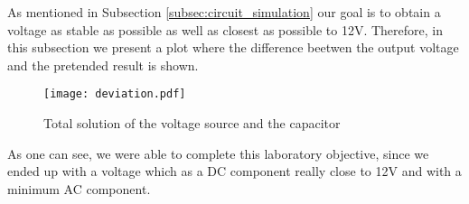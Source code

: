 \par As mentioned in Subsection \ref{subsec:circuit_simulation} our goal is to obtain a voltage as stable as possible as well as closest as possible to 12V. Therefore, in this subsection we present a plot where the difference beetwen the output voltage and the pretended result is shown.

\begin{figure}[H] \centering
\texttt{[image: deviation.pdf]}
\caption{Total solution of the voltage source and the capacitor}
\label{fig:vo-12}
\end{figure}


As one can see, we were able to complete this laboratory objective, since we ended up with a voltage which as a DC component really close to 12V and with a minimum AC component.


